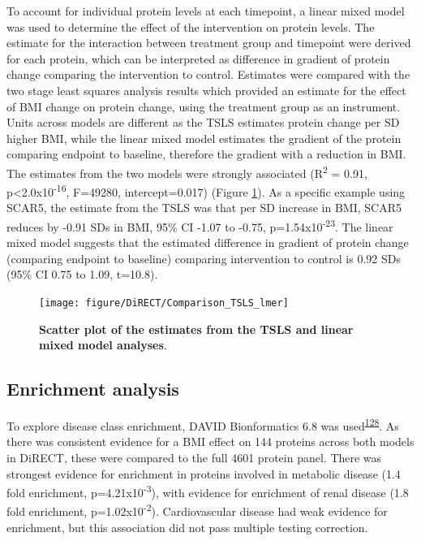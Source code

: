 \documentclass[11pt,twoside]{bristolthesis}
\begin{document}
To account for individual protein levels at each timepoint, a linear mixed model was used to determine the effect of the intervention on protein levels. The estimate for the interaction between treatment group and timepoint were derived for each protein, which can be interpreted as difference in gradient of protein change comparing the intervention to control. Estimates were compared with the two stage least squares analysis results which provided an estimate for the effect of BMI change on protein change, using the treatment group as an instrument. Units across models are different as the TSLS estimates protein change per SD higher BMI, while the linear mixed model estimates the gradient of the protein comparing endpoint to baseline, therefore the gradient with a reduction in BMI. The estimates from the two models were strongly associated (R\textsuperscript{2} = 0.91, p\textless2.0x10\textsuperscript{-16}, F=49280, intercept=0.017) (Figure \ref{fig:tsls-lmer}). As a specific example using SCAR5, the estimate from the TSLS was that per SD increase in BMI, SCAR5 reduces by -0.91 SDs in BMI, 95\% CI -1.07 to -0.75, p=1.54x10\textsuperscript{-23}. The linear mixed model suggests that the estimated difference in gradient of protein change (comparing endpoint to baseline) comparing intervention to control is 0.92 SDs (95\% CI 0.75 to 1.09, t=10.8).



\begin{figure}
\texttt{[image: figure/DiRECT/Comparison\_TSLS\_lmer]} \caption[Scatter plot of the estimates from the TSLS and linear mixed model analyses]{\textbf{Scatter plot of the estimates from the TSLS and linear mixed model analyses}.}\label{fig:tsls-lmer}
\end{figure}
\hypertarget{enrichment-analysis-1}{%
\subsection{Enrichment analysis}\label{enrichment-analysis-1}}

To explore disease class enrichment, DAVID Bionformatics 6.8 was used\textsuperscript{\protect\hyperlink{ref-Huang2009}{128}}. As there was consistent evidence for a BMI effect on 144 proteins across both models in DiRECT, these were compared to the full 4601 protein panel. There was strongest evidence for enrichment in proteins involved in metabolic disease (1.4 fold enrichment, p=4.21x10\textsuperscript{-3}), with evidence for enrichment of renal disease (1.8 fold enrichment, p=1.02x10\textsuperscript{-2}). Cardiovascular disease had weak evidence for enrichment, but this association did not pass multiple testing correction.
\end{document}
